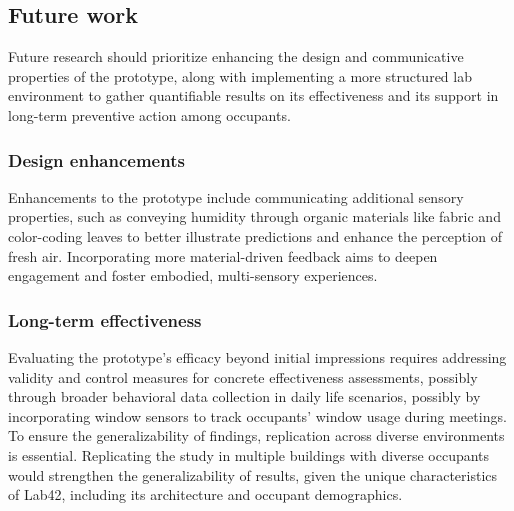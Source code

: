 \subsection{Future work}

Future research should prioritize enhancing the design and communicative properties of the prototype, along with implementing a more structured lab environment to gather quantifiable results on its effectiveness and its support in long-term preventive action among occupants. 

\subsubsection{Design enhancements}
Enhancements to the prototype include communicating additional sensory properties, such as conveying humidity through organic materials like fabric and color-coding leaves to better illustrate predictions and enhance the perception of fresh air. Incorporating more material-driven feedback aims to deepen engagement and foster embodied, multi-sensory experiences.

\subsubsection{Long-term effectiveness}
Evaluating the prototype's efficacy beyond initial impressions requires addressing validity and control measures for concrete effectiveness assessments, possibly through broader behavioral data collection in daily life scenarios, possibly by incorporating window sensors to track occupants' window usage during meetings. To ensure the generalizability of findings, replication across diverse environments is essential. Replicating the study in multiple buildings with diverse occupants would strengthen the generalizability of results, given the unique characteristics of Lab42, including its architecture and occupant demographics.